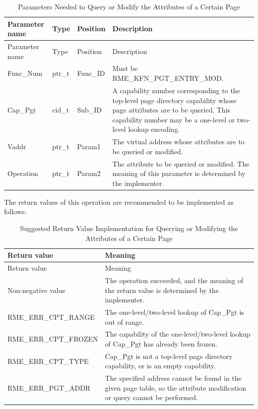 \begin{xltabular}{\textwidth}{@{}>{\hsize\raggedright\arraybackslash}X>{\hsize\raggedright\arraybackslash}X>{\hsize\raggedright\arraybackslash}X>{\hsize\raggedright\arraybackslash}X@{}}
\caption{Parameters Needed to Query or Modify the Attributes of a Certain Page}\label{tab:8-13-query-or-modify-page-attributes-parameters}\\
\toprule
Parameter name & Type & Position & Description\tabularnewline
\endfirsthead
\toprule
Parameter name & Type & Position & Description\tabularnewline
\midrule
\endhead
\bottomrule
\endlastfoot
Func\_Num & ptr\_t & Func\_ID & Must be RME\_KFN\_PGT\_ENTRY\_MOD.\tabularnewline
Cap\_Pgt & cid\_t & Sub\_ID &
A capability number corresponding to the top-level page directory capability whose page attributes are to be queried. This capability number may be a one-level or two-level lookup encoding.\tabularnewline
Vaddr & ptr\_t & Param1 & The virtual address whose attributes are to be queried or modified.\tabularnewline
Operation & ptr\_t & Param2 &
The attribute to be queried or modified. The meaning of this parameter is determined by the implementer.\tabularnewline
\end{xltabular}
\nopagebreak[4]

The return values of this operation are recommended to be implemented as follows:

\begin{xltabular}{\textwidth}{@{}>{\hsize\raggedright\arraybackslash}X>{\hsize\raggedright\arraybackslash}X@{}}
\caption{Suggested Return Value Implementation for Querying or Modifying the Attributes of a Certain Page}\label{tab:8-14-query-or-modify-page-attributes-suggested-return-values}\\
\toprule
Return value & Meaning\tabularnewline
\endfirsthead
\toprule
Return value & Meaning\tabularnewline
\midrule
\endhead
\bottomrule
\endlastfoot
    Non-negative value & The operation succeeded, and the meaning of the return value is determined by the implementer.\tabularnewline
    RME\_ERR\_CPT\_RANGE & The one-level/two-level lookup of Cap\_Pgt is out of range.\tabularnewline
    RME\_ERR\_CPT\_FROZEN & The capability of the one-level/two-level lookup of Cap\_Pgt has already been frozen.\tabularnewline
    RME\_ERR\_CPT\_TYPE & Cap\_Pgt is not a top-level page directory capability, or is an empty capability.\tabularnewline
    RME\_ERR\_PGT\_ADDR & The specified address cannot be found in the given page table, so the attribute modification or query cannot be performed.\tabularnewline
\end{xltabular}
\nopagebreak[4]

